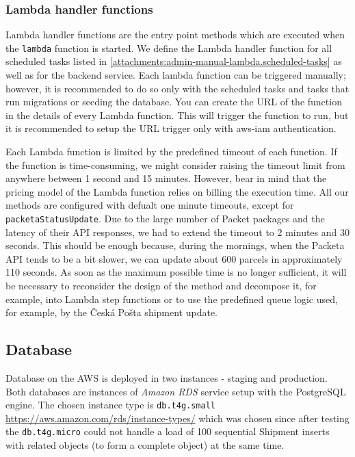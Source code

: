 \subsubsection{Lambda handler functions}
Lambda handler functions are the entry point methods which are executed when the \texttt{lambda} function is started.
We define the Lambda handler function for all scheduled tasks listed in \ref{attachments:admin-manual-lambda.scheduled-tasks} as well as for the backend service.
Each lambda function can be triggered manually; however, it is recommended to do so only with the scheduled tasks and tasks that run migrations or seeding the database.
You can create the URL of the function in the details of every Lambda function.
This will trigger the function to run, but it is recommended to setup the URL trigger only with \gls{aws-iam} authentication.

Each Lambda function is limited by the predefined timeout of each function.
If the function is time-consuming, we might consider raising the timeout limit from anywhere between 1 second and 15 minutes.
However, bear in mind that the pricing model of the Lambda function relies on billing the execution time.
All our methods are configured with defualt one minute timeouts, except for \texttt{packetaStatusUpdate}.
Due to the large number of Packet packages and the latency of their API responses, we had to extend the timeout to 2 minutes and 30 seconds.
This should be enough because, during the mornings, when the Packeta API tends to be a bit slower, we can update about 600 parcels in approximately 110 seconds.
As soon as the maximum possible time is no longer sufficient, it will be necessary to reconsider the design of the method and decompose it, for example, into Lambda step functions or to use the predefined queue logic used, for example, by the Česká Pošta shipment update.




\subsection{Database}
Database on the AWS is deployed in two instances - staging and production.
Both databases are instances of \textit{Amazon RDS} service setup with the PostgreSQL engine.
The chosen instance type is \texttt{db.t4g.small} \url{https://aws.amazon.com/rds/instance-types/} which was chosen since after testing the \texttt{db.t4g.micro} could not handle a load of 100 sequential Shipment inserts with related objects (to form a complete object) at the same time.

